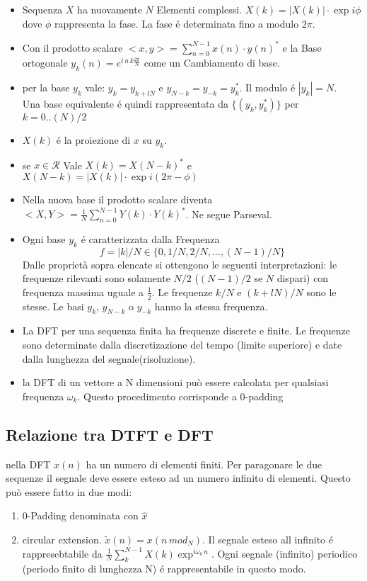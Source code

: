 \documentclass[11pt,a4paper,DIV12,BCOR1.5mm]{scrartcl}
\begin{document}
\begin{itemize}
\item 
	Sequenza $X$ ha nuovamente $N$ Elementi complessi. $X(k) = |X(k)| \cdot \exp{i\phi}$ dove $\phi$ rappresenta la fase. La fase é determinata fino a modulo $2\pi$. 
\item 
	Con il prodotto scalare $ <x,y> =  \sum_{n=0}^{N-1} x(n)\cdot y(n)^*$  e la Base ortogonale $y_k(n)= e^{i\,n\,k \frac{2\pi}{N}}$ come un Cambiamento di base.
\item 
	per la base $y_k$ vale: $y_k = y_{k+lN}$  e $ y_{N-k} = y_{-k} = y_{k}^* $. Il modulo é $|y_k|=N$.\\
	Una base equivalente é quindi rappresentata da $\{(y_k, y_{k}^*)\}$ per $ k = 0..(N)/2$  
\item 
	$X(k)$ é la proiezione di $x$ su $y_k$.
\item 
	se $x \in \mathcal{R}$  Vale $X(k)= X(N-k)^*$ e $X(N-k) = |X(k)|\cdot \exp{i(2\pi-\phi)} $  
\item 
	Nella nuova base il prodotto scalare diventa $<X,Y> = \frac{1}{N}\sum_{n=0}^{N-1} Y(k)\cdot Y(k)^*$. Ne segue Parseval.
\item 
	Ogni base $y_k$ é caratterizzata dalla Frequenza 
	\begin{equation}
	f=|k|/N \in\{0,1/N,2/N,...,(N-1)/N\} 
	\end{equation}
	Dalle proprietà sopra elencate si ottengono le seguenti interpretazioni: le frequenze rilevanti sono solamente $N/2$ ($(N-1)/2$ se $N$ dispari) con frequenza massima uguale a $\frac{1}{2}$. Le frequenze $k/N$ e $(k+lN)/N$ sono le stesse. Le basi $y_k$, $y_{N-k}$ o $y_{-k}$ hanno la stessa frequenza.
\item 
	La DFT per una sequenza finita ha frequenze discrete e finite. Le frequenze sono determinate dalla discretizazione del tempo (limite superiore) e date dalla lunghezza del segnale(risoluzione).
	
\item la DFT di un vettore a N dimensioni può essere calcolata per qualsiasi frequenza $\omega_k$. Questo procedimento corrisponde a 0-padding
\end{itemize}

\subsection{Relazione tra DTFT e DFT}
nella DFT $x(n)$ ha un numero di elementi finiti. Per paragonare le due sequenze il segnale deve essere esteso ad un numero infinito di elementi. Questo può essere fatto in due modi:
\begin{enumerate}
	\item 0-Padding denominata con $\hat x$
	\item circular extension. $\tilde x (n) = x( n \, mod_N)$. Il segnale esteso all infinito é rappresebtabile da $\frac{1}{N}\sum_k ^{N-1} X(k) \exp^{i\omega_k\,n}$.
	Ogni segnale (infinito) periodico (periodo finito di lunghezza N) é rappresentabile in questo modo. 
\end{enumerate}
\end{document}

